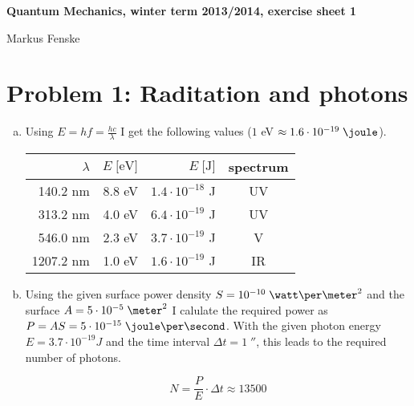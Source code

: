 \documentclass[a4paper,german,12pt,smallheadings]{scrartcl}
\begin{document}
\begin{center}
\bfseries %
\sffamily %
\vspace{-40pt}
Quantum Mechanics, winter term 2013/2014, exercise sheet 1

Markus Fenske
\vspace{-10pt}
\end{center}

\section*{Problem 1: Raditation and photons}

\begin{enumerate}[a)]

\item
  Using $E = hf = \frac{hc}{\lambda}$ I get the following values ($1$ eV $\approx 1.6\cdot10^{-19}\;\joule$).
  \vspace{7mm}

  \begin{tabular}{r | r | r | c}
    $\lambda$ & $E\;\text{[eV]}$ & $E\;\text{[J]}$ & spectrum \\
    \hline
    140.2 nm  & 8.8 eV & $1.4 \cdot 10^{-18}$ J & UV \\
    313.2 nm  & 4.0 eV & $6.4 \cdot 10^{-19}$ J & UV \\
    546.0 nm  & 2.3 eV & $3.7 \cdot 10^{-19}$ J & V \\
    1207.2 nm  & 1.0 eV & $1.6 \cdot 10^{-19}$ J & IR \\
  \end{tabular}

\item
  Using the given surface power density $S = 10^{-10}\;\watt\per\meter^2$
  and the surface $A = 5\cdot10^{-5}\;\meter^2$ I calulate the required power
  as $P = AS = 5 \cdot 10^{-15}\;\joule\per\second$. With the given photon
  energy $E=3.7 \cdot 10^{-19} J$ and the time interval $\Delta t =
  1\;\second$, this leads to the required number of photons.

  \begin{equation*}
    N = \frac{P}{E} \cdot \Delta t \approx 13500
  \end{equation*}

\end{enumerate}
\end{document}
